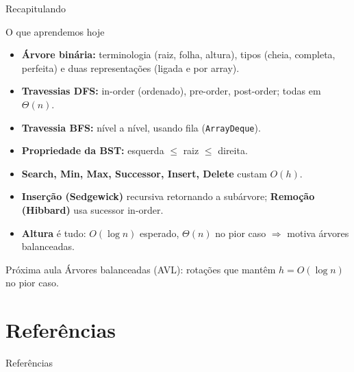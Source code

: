 \documentclass[aspectratio=169]{beamer}
\begin{document}
\begin{frame}[shrink=10]{Recapitulando}
\begin{block}{O que aprendemos hoje}
\begin{itemize}\small
  \item \textbf{Árvore binária:} terminologia (raiz, folha, altura), tipos (cheia, completa, perfeita) e duas representações (ligada e por array).
  \item \textbf{Travessias DFS:} in-order (ordenado), pre-order, post-order; todas em $\Theta(n)$.
  \item \textbf{Travessia BFS:} nível a nível, usando fila (\texttt{ArrayDeque}).
  \item \textbf{Propriedade da BST:} esquerda $\le$ raiz $\le$ direita.
  \item \textbf{Search, Min, Max, Successor, Insert, Delete} custam $O(h)$.
  \item \textbf{Inserção (Sedgewick)} recursiva retornando a subárvore; \textbf{Remoção (Hibbard)} usa sucessor in-order.
  \item \textbf{Altura} é tudo: $O(\log n)$ esperado, $\Theta(n)$ no pior caso $\Rightarrow$ motiva árvores balanceadas.
\end{itemize}
\end{block}
\begin{exampleblock}{Próxima aula}
Árvores balanceadas (AVL): rotações que mantêm $h = O(\log n)$ no pior caso.
\end{exampleblock}
\end{frame}

\section*{Referências}
\begin{frame}[allowframebreaks]{Referências}
\nocite{*}

\footnotesize

\end{frame}
\end{document}
